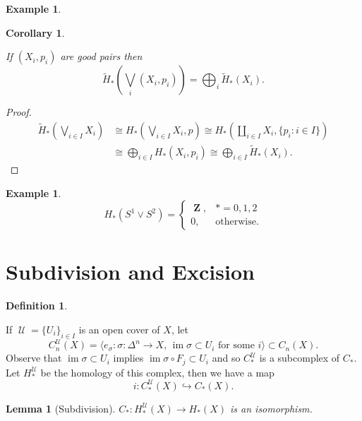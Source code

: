\documentclass[10pt,]{book}
\theoremstyle{plain}
\newtheorem{corollary}[theorem]{Corollary}
\newtheorem{lemma}[theorem]{Lemma}
\theoremstyle{definition}
\newtheorem{definition}[theorem]{Definition}
\newtheorem{example}[theorem]{Example}
\numberwithin{equation}{section}
\DeclareMathOperator{\im}{im}
\DeclareMathOperator{\ZZ}{\mathbf{Z}}
\DeclareMathOperator{\U}{\mathcal{U}}
\begin{document}
\begin{example}\label{example-14}
\end{example}
\begin{corollary}\label{corollary-5}

              If \((X_i, p_i)\) are good pairs then
              \[
                \tilde H_*\left(\bigvee_{i}(X_i, p_i)\right) = \bigoplus_i \tilde H_*(X_i).
              \]\end{corollary}
\begin{proof}
\begin{align*}
\tilde H_*\left(\bigvee_{i\in I} X_i\right) &\cong H_*\left(\bigvee_{i\in I} X_i, p\right) \cong H_*\left(\coprod_{i\in I} X_i, \{p_i : i\in I\}\right)\\
&\cong \bigoplus_{i\in I} H_*\left(X_i, p_i\right) \cong \bigoplus_{i\in I} \tilde H_*(X_i).
\end{align*}\end{proof}
\begin{example}\label{example-15}
\[
                H_*(S^1 \vee S^2) = \begin{cases}\ZZ, &* = 0,1,2\\0, &\text{otherwise}.\end{cases}
              \]\end{example}
\typeout{************************************************}
\typeout{************************************************}
\section[Subdivision and Excision]{Subdivision and Excision}\label{sec-subdivision}
\begin{definition}\label{definition-18}

            If \(\U = \{U_i\}_{i\in I}\) is an open cover of \(X\), let
            \[
              C^{\U}_n(X) = \langle e_\sigma : \sigma\colon \Delta^n \to X,\,\im\sigma\subset U_i\text{ for some }i\rangle \subset C_n(X).
            \]
            Observe that \(\im \sigma \subset U_i\) implies \(\im \sigma \circ F_j \subset U_i\) and so \(C^{\U}_*\) is a subcomplex of \(C_*\).
            Let \(H^{\U}_*\) be the homology of this complex, then we have a map
            \[
              i\colon C^{\U}_*(X) \hookrightarrow C_*(X).
            \]\end{definition}
\begin{lemma}[Subdivision]\label{lemma-6}
\(C_*\colon H^{\U}_*(X) \to H_*(X)\) is an isomorphism.
          \end{lemma}
\typeout{************************************************}
\typeout{************************************************}
\end{document}
